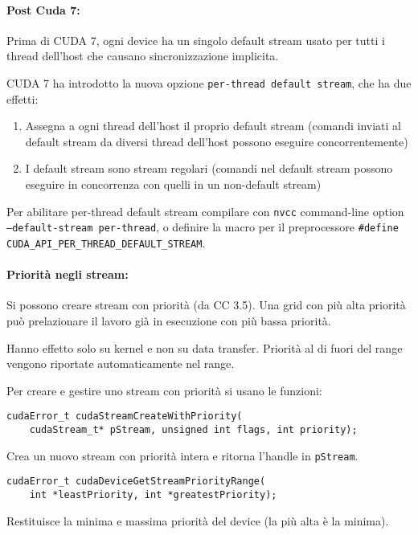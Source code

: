\paragraph{Post Cuda 7:} Prima di CUDA 7, ogni device ha un singolo default stream usato per tutti i thread dell'host che causano sincronizzazione implicita. 

CUDA 7 ha introdotto la nuova opzione \texttt{per-thread default stream}, che ha due effetti:
\begin{enumerate}
	\item Assegna a ogni thread dell'host il proprio default stream (comandi inviati al default stream da diversi thread dell'host possono eseguire concorrentemente)
	
	\item I default stream sono stream regolari (comandi nel default stream possono eseguire in concorrenza con quelli in un non-default stream)
\end{enumerate}

Per abilitare per-thread default stream compilare con \texttt{nvcc} command-line option \texttt{--default-stream per-thread}, o definire la macro per il preprocessore \texttt{\#define CUDA\_API\_PER\_THREAD\_DEFAULT\_STREAM}.\\

\paragraph{Priorità negli stream:} Si possono creare stream con priorità (da CC 3.5). Una grid con più alta priorità può prelazionare il lavoro già in esecuzione con più bassa priorità. 

Hanno effetto solo su kernel e non su data transfer. Priorità al di fuori del range vengono riportate automaticamente nel range.

Per creare e gestire uno stream con priorità si usano le funzioni:
\begin{verbatim}
cudaError_t cudaStreamCreateWithPriority(
    cudaStream_t* pStream, unsigned int flags, int priority);
\end{verbatim}

Crea un nuovo stream con priorità intera e ritorna l'handle in \texttt{pStream}.

\begin{verbatim}
cudaError_t cudaDeviceGetStreamPriorityRange(
    int *leastPriority, int *greatestPriority);
\end{verbatim}

Restituisce la minima e massima priorità del device (la più alta è la minima).


